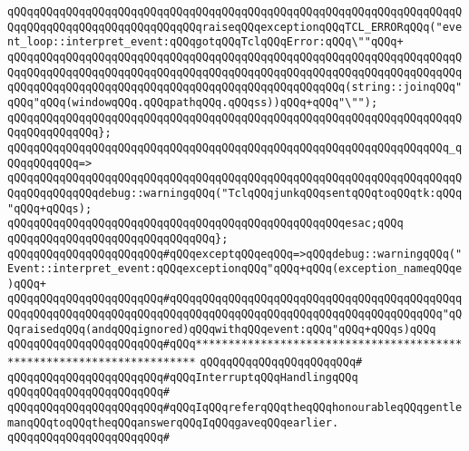 \newline
\verb|qQQqqQQqqQQqqQQqqQQqqQQqqQQqqQQqqQQqqQQqqQQqqQQqqQQqqQQqqQQqqQQqqQQqqQQqqQQqqQQqqQQqqQQqqQQqqQQqqQQqraiseqQQqexceptionqQQqTCL_ERRORqQQq("event_loop::interpret_event:qQQqgotqQQqTclqQQqError:qQQq\""qQQq+|\newline
\verb|qQQqqQQqqQQqqQQqqQQqqQQqqQQqqQQqqQQqqQQqqQQqqQQqqQQqqQQqqQQqqQQqqQQqqQQqqQQqqQQqqQQqqQQqqQQqqQQqqQQqqQQqqQQqqQQqqQQqqQQqqQQqqQQqqQQqqQQqqQQqqQQqqQQqqQQqqQQqqQQqqQQqqQQqqQQqqQQqqQQqqQQqqQQqqQQq(string::joinqQQq"qQQq"qQQq(windowqQQq.qQQqpathqQQq.qQQqss))qQQq+qQQq"\"");|\newline
\verb|qQQqqQQqqQQqqQQqqQQqqQQqqQQqqQQqqQQqqQQqqQQqqQQqqQQqqQQqqQQqqQQqqQQqqQQqqQQqqQQqqQQq};|\newline
\newline
\verb|qQQqqQQqqQQqqQQqqQQqqQQqqQQqqQQqqQQqqQQqqQQqqQQqqQQqqQQqqQQqqQQqqQQq_qQQqqQQqqQQq=>|\newline
\verb|qQQqqQQqqQQqqQQqqQQqqQQqqQQqqQQqqQQqqQQqqQQqqQQqqQQqqQQqqQQqqQQqqQQqqQQqqQQqqQQqqQQqdebug::warningqQQq("TclqQQqjunkqQQqsentqQQqtoqQQqtk:qQQq"qQQq+qQQqs);|\newline
\verb|qQQqqQQqqQQqqQQqqQQqqQQqqQQqqQQqqQQqqQQqqQQqqQQqqQQqesac;qQQq|\newline
\verb|qQQqqQQqqQQqqQQqqQQqqQQqqQQqqQQq};|\newline
\newline
\verb|qQQqqQQqqQQqqQQqqQQqqQQq#qQQqexceptqQQqeqQQq=>qQQqdebug::warningqQQq("Event::interpret_event:qQQqexceptionqQQq"qQQq+qQQq(exception_nameqQQqe)qQQq+|\newline
\verb|qQQqqQQqqQQqqQQqqQQqqQQq#qQQqqQQqqQQqqQQqqQQqqQQqqQQqqQQqqQQqqQQqqQQqqQQqqQQqqQQqqQQqqQQqqQQqqQQqqQQqqQQqqQQqqQQqqQQqqQQqqQQqqQQqqQQqqQQq"qQQqraisedqQQq(andqQQqignored)qQQqwithqQQqevent:qQQq"qQQq+qQQqs)qQQq|\newline
\newline
\newline
\verb|qQQqqQQqqQQqqQQqqQQqqQQq#qQQq**********************************************************************|\newline
\verb|qQQqqQQqqQQqqQQqqQQqqQQq#|\newline
\verb|qQQqqQQqqQQqqQQqqQQqqQQq#qQQqInterruptqQQqHandlingqQQq|\newline
\verb|qQQqqQQqqQQqqQQqqQQqqQQq#|\newline
\verb|qQQqqQQqqQQqqQQqqQQqqQQq#qQQqIqQQqreferqQQqtheqQQqhonourableqQQqgentlemanqQQqtoqQQqtheqQQqanswerqQQqIqQQqgaveqQQqearlier.|\newline
\verb|qQQqqQQqqQQqqQQqqQQqqQQq#|\newline
